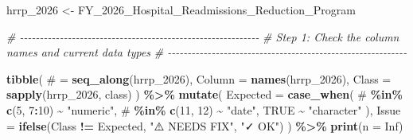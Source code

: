 \documentclass[
]{article}
\newenvironment{Shaded}{\begin{snugshade}}{\end{snugshade}}
\newcommand{\AttributeTok}[1]{\textcolor[rgb]{0.13,0.29,0.53}{#1}}
\newcommand{\CommentTok}[1]{\textcolor[rgb]{0.56,0.35,0.01}{\textit{#1}}}
\newcommand{\ConstantTok}[1]{\textcolor[rgb]{0.56,0.35,0.01}{#1}}
\newcommand{\DecValTok}[1]{\textcolor[rgb]{0.00,0.00,0.81}{#1}}
\newcommand{\FunctionTok}[1]{\textcolor[rgb]{0.13,0.29,0.53}{\textbf{#1}}}
\newcommand{\NormalTok}[1]{#1}
\newcommand{\OtherTok}[1]{\textcolor[rgb]{0.56,0.35,0.01}{#1}}
\newcommand{\SpecialCharTok}[1]{\textcolor[rgb]{0.81,0.36,0.00}{\textbf{#1}}}
\newcommand{\StringTok}[1]{\textcolor[rgb]{0.31,0.60,0.02}{#1}}
\begin{document}
\begin{Shaded}
\begin{Highlighting}[]
\NormalTok{hrrp\_2026 }\OtherTok{\textless{}{-}}\NormalTok{ FY\_2026\_Hospital\_Readmissions\_Reduction\_Program}

\CommentTok{\# {-}{-}{-}{-}{-}{-}{-}{-}{-}{-}{-}{-}{-}{-}{-}{-}{-}{-}{-}{-}{-}{-}{-}{-}{-}{-}{-}{-}{-}{-}{-}{-}{-}{-}{-}{-}{-}{-}{-}{-}{-}{-}{-}{-}{-}{-}{-}{-}{-}{-}{-}{-}{-}{-}{-}{-}{-}{-}{-}{-}}
\CommentTok{\# Step 1: Check the column names and current data types}
\CommentTok{\# {-}{-}{-}{-}{-}{-}{-}{-}{-}{-}{-}{-}{-}{-}{-}{-}{-}{-}{-}{-}{-}{-}{-}{-}{-}{-}{-}{-}{-}{-}{-}{-}{-}{-}{-}{-}{-}{-}{-}{-}{-}{-}{-}{-}{-}{-}{-}{-}{-}{-}{-}{-}{-}{-}{-}{-}{-}{-}{-}{-}}

\FunctionTok{tibble}\NormalTok{(}
    \StringTok{\textasciigrave{}}\AttributeTok{\#}\StringTok{\textasciigrave{}}      \OtherTok{=} \FunctionTok{seq\_along}\NormalTok{(hrrp\_2026),}
    \AttributeTok{Column   =} \FunctionTok{names}\NormalTok{(hrrp\_2026),}
    \AttributeTok{Class    =} \FunctionTok{sapply}\NormalTok{(hrrp\_2026, class)}
\NormalTok{) }\SpecialCharTok{\%\textgreater{}\%}
    \FunctionTok{mutate}\NormalTok{(}
        \AttributeTok{Expected =} \FunctionTok{case\_when}\NormalTok{(}
            \StringTok{\textasciigrave{}}\AttributeTok{\#}\StringTok{\textasciigrave{}} \SpecialCharTok{\%in\%} \FunctionTok{c}\NormalTok{(}\DecValTok{5}\NormalTok{, }\DecValTok{7}\SpecialCharTok{:}\DecValTok{10}\NormalTok{) }\SpecialCharTok{\textasciitilde{}} \StringTok{"numeric"}\NormalTok{,}
            \StringTok{\textasciigrave{}}\AttributeTok{\#}\StringTok{\textasciigrave{}} \SpecialCharTok{\%in\%} \FunctionTok{c}\NormalTok{(}\DecValTok{11}\NormalTok{, }\DecValTok{12}\NormalTok{)  }\SpecialCharTok{\textasciitilde{}} \StringTok{"date"}\NormalTok{,}
            \ConstantTok{TRUE}                \SpecialCharTok{\textasciitilde{}} \StringTok{"character"}
\NormalTok{        ),}
        \AttributeTok{Issue =} \FunctionTok{ifelse}\NormalTok{(Class }\SpecialCharTok{!=}\NormalTok{ Expected, }\StringTok{"⚠️ NEEDS FIX"}\NormalTok{, }\StringTok{"✓ OK"}\NormalTok{)}
\NormalTok{    ) }\SpecialCharTok{\%\textgreater{}\%}
    \FunctionTok{print}\NormalTok{(}\AttributeTok{n =} \ConstantTok{Inf}\NormalTok{)}
\end{Highlighting}
\end{Shaded}
\end{document}

